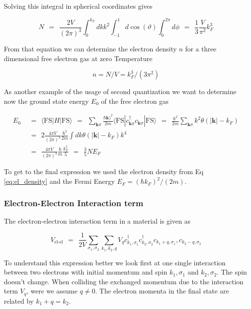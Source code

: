 \documentclass[10pt]{report}
\numberwithin{equation}{chapter}
\newcommand{\refEq}[1]{
  Eq  \ref{#1}
}
\begin{document}
Solving this integral in spherical coordinates gives

\begin{equation}
  N ~~=~~ \frac{2V}{(2\pi)^3} \int_0^{k_F} dk k^2 \int_{-1}^1 d\cos(\vartheta) \int_0^{2\pi} d\phi
  ~~=~~ \frac{1}{3} \frac{V}{\pi^2} k_F^3
\end{equation}

From that equation we can determine the electron density  $n$ for a  three dimensional free electron gas at zero Temperature 

\begin{equation}\label{eq:el_density}
  n = N/V = k_F^3/(3\pi^2)
\end{equation}


As another example of the usage of second quantization we want to determine now the ground state energy $E_0$ of the free electron gas

\begin{align}
  E_0 ~~& =~~ \langle \text{FS} | H | \text{FS} \rangle 
  ~~=~~ \sum_{\mathbf{k} \sigma} \frac{\hbar \mathbf{k})^2}{2m} \langle \text{FS} | c^\dag_{\mathbf{k} \sigma} c_{\mathbf{k} \sigma} | \text{FS} \rangle
  ~~=~~ \frac{\hbar^2}{2m} \sum_{\mathbf{k}\sigma} k^2 \theta(|\mathbf{k}| - k_F) \nonumber \\ 
  ~~& =~~ 2 \frac{4\pi V}{(2\pi)^3} \frac{\hbar^2}{2m} \int dk \theta(|\mathbf{k}| - k_F) k^4\nonumber \\
  ~~& =~~ \frac{4\pi V}{(2\pi)^3} \frac{\hbar}{m} \frac{k_F^5}{5} ~~=~~ \frac{3}{5} N E_F
\end{align}

To get to the final expression we used the electron density from \refEq{eq:el_density} and the Fermi Energy $E_F = (\hbar k_F)^2/(2m)$. 



\subsubsection{Electron-Electron Interaction term}

The electron-electron interaction term in a material is given as

\begin{equation}
  V_\text{el-el} ~~=~~ \frac{1}{2V} \sum_{\sigma_1, \sigma_2} \sum_{k_1, k_2, q} 
  V_q c^\dag_{k_1, \sigma_1} c^\dag_{k_2, \sigma_2} c_{k_1+q, \sigma_1}, c_{k_2-q, \sigma_2} 
\end{equation}


To understand this expression better we look first at one single interaction between two electrons with initial momentum and spin $k_1, \sigma_1$ and $k_2, \sigma_2$. The spin doesn't change. When colliding the exchanged momentum due to the interaction term $V_q$, were we assume $q \neq 0$. The electron momenta in the final state are related by $k_1 + q = k_2$.
\end{document}
